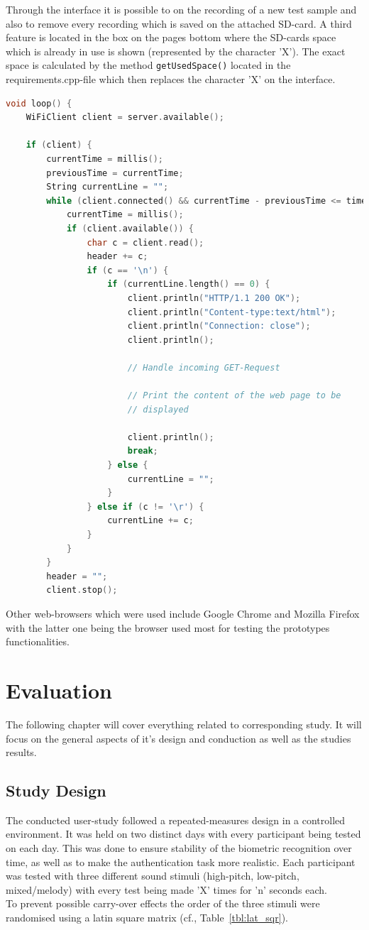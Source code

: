 Through the interface it is possible to on the recording of a new test sample and also to remove every recording which is saved on the attached SD-card.
A third feature is located in the box on the pages bottom where the SD-cards space which is already in use is shown (represented by the character 'X').
The exact space is calculated by the method \texttt{getUsedSpace()} located in the requirements.cpp-file which then replaces the character 'X' on the interface. 
\begin{lstlisting}[frame=single, language={c++}, style=style,
	caption={The part of the loop-function which is used to manage the connection of a socket hosted on the microcontroller to a web-client.}, label={lst:WiFiCon},float=!htb]
void loop() {
	WiFiClient client = server.available();
	
	if (client) {
		currentTime = millis();
		previousTime = currentTime;
		String currentLine = "";
		while (client.connected() && currentTime - previousTime <= timeoutTime) {
			currentTime = millis();
			if (client.available()) {
				char c = client.read();
				header += c;
				if (c == '\n') {
					if (currentLine.length() == 0) {
						client.println("HTTP/1.1 200 OK");
						client.println("Content-type:text/html");
						client.println("Connection: close");
						client.println();
						
						// Handle incoming GET-Request
						
						// Print the content of the web page to be
						// displayed
						
						client.println();
						break;
					} else {
						currentLine = "";
					}
				} else if (c != '\r') {
					currentLine += c;
				}
			}
		}
		header = "";
		client.stop();
\end{lstlisting}

Other web-browsers which were used include Google Chrome and Mozilla Firefox with the latter one being the browser used most for testing the prototypes functionalities.

\section{Evaluation}
The following chapter will cover everything related to corresponding study. 
It will focus on the general aspects of it's design and conduction as well as the studies results.

\subsection{Study Design}
The conducted user-study followed a repeated-measures design in a controlled environment.
It was held on two distinct days with every participant being tested on each day.
This was done to ensure stability of the biometric recognition over time, as well as to make the authentication task more realistic.
Each participant was tested with three different sound stimuli (high-pitch, low-pitch, mixed/melody) with every test being made 'X' times for 'n' seconds each.\\
To prevent possible carry-over effects the order of the three stimuli were randomised using a latin square matrix (cf., Table~\ref{tbl:lat_sqr}).

